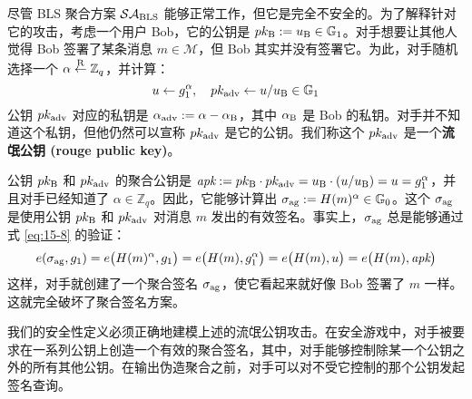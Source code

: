 \begin{snote}[流氓公钥攻击。]
尽管 BLS 聚合方案 $\mathcal{SA}_{\rm BLS}$ 能够正常工作，但它是完全不安全的。为了解释针对它的攻击，考虑一个用户 Bob，它的公钥是 $pk_{\rm B}:=u_{\rm B}\in\mathbb{G}_1$。对手想要让其他人觉得 Bob 签署了某条消息 $m\in\mathcal{M}$，但 Bob 其实并没有签署它。为此，对手随机选择一个 $\alpha\overset{\rm R}\leftarrow\mathbb{Z}_q$，并计算：
\begin{equation}\label{eq:15-9}
u\leftarrow g_1^\alpha,
\quad
pk_{\rm adv}\leftarrow{u}/{u_{\rm B}}\in\mathbb{G}_1
\end{equation}
公钥 $pk_{\rm adv}$ 对应的私钥是 $\alpha_{\rm adv}:=\alpha-\alpha_{\rm B}$，其中 $\alpha_{\rm B}$ 是 Bob 的私钥。对手并不知道这个私钥，但他仍然可以宣称 $pk_{\rm adv}$ 是它的公钥。我们称这个 $pk_{\rm adv}$ 是一个\textbf{流氓公钥 (rouge public key)}。

公钥 $pk_{\rm B}$ 和 $pk_{\rm adv}$ 的聚合公钥是 $\textit{apk}:=pk_{\rm B}\cdot pk_{\rm adv} = u_{\rm B}\cdot({u}/{u_{\rm B}})=u=g_1^\alpha$，并且对手已经知道了 $\alpha \in \mathbb{Z}_q$。因此，它能够计算出 $\sigma_{\rm ag}:=H(m)^\alpha \in \mathbb{G}_0$。这个 $\sigma_{\rm ag}$ 是使用公钥 $pk_{\rm B}$ 和 $pk_{\rm adv}$ 对消息 $m$ 发出的有效签名。事实上，$\sigma_{\rm ag}$ 总是能够通过式 \ref{eq:15-8} 的验证：
\[
e(\sigma_{\rm ag},g_1)
=e\big(H(m)^\alpha,g_1\big)
=e\big(H(m),g_1^\alpha\big)
=e\big(H(m),u\big)
=e\big(H(m),\textit{apk}\big)
\]
这样，对手就创建了一个聚合签名 $\sigma_{\rm ag}$，使它看起来就好像 Bob 签署了 $m$ 一样。这就完全破坏了聚合签名方案。
\end{snote}

\begin{snote}[安全聚合的定义。]
我们的安全性定义必须正确地建模上述的流氓公钥攻击。在安全游戏中，对手被要求在一系列公钥上创造一个有效的聚合签名，其中，对手能够控制除某一个公钥之外的所有其他公钥。在输出伪造聚合之前，对手可以对不受它控制的那个公钥发起签名查询。
\end{snote}

